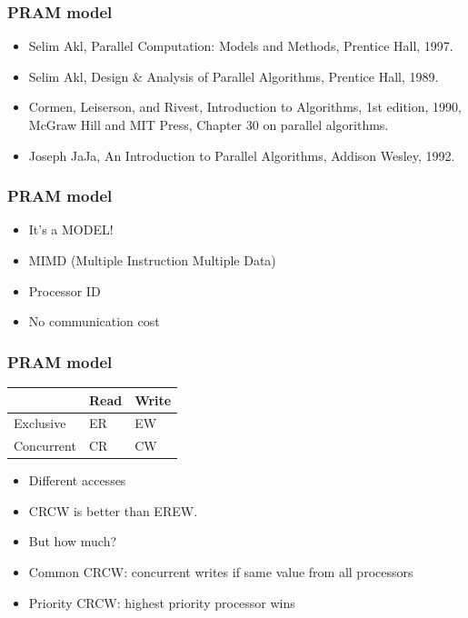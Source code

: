 \documentclass[14pt,aspectratio=169]{beamer}
\begin{document}
\begin{frame}\frametitle{PRAM model}
  \begin{itemize}[<.->]
    \item
Selim Akl, Parallel Computation: Models and Methods, Prentice Hall, 1997.    
    \item
Selim Akl, Design \& Analysis of Parallel Algorithms, Prentice Hall, 1989.
    \item
Cormen, Leiserson, and Rivest, Introduction to Algorithms, 1st edition,
1990, McGraw Hill and MIT Press, Chapter 30 on parallel algorithms.
    \item
Joseph JaJa, An Introduction to Parallel Algorithms, Addison Wesley, 1992.
\end{itemize}
\end{frame}

\begin{frame}\frametitle{PRAM model}
  \begin{itemize}
  \item
    It's a \alert{MODEL}!
  \item
    MIMD (Multiple Instruction Multiple Data)
  \item
    Processor ID
  \item
    No communication cost
  \end{itemize}
\end{frame}

\begin{frame}\frametitle{PRAM model}
\begin{center}
  \begin{tabular}{|l|l|l|}
\hline
 & Read & Write \\
\hline
Exclusive & ER & EW \\
\hline
Concurrent & CR & CW \\
\hline
\end{tabular}

\begin{itemize}
\item
  Different accesses
  \item
    CRCW is better than EREW.
  \item
    But how much?
  \item
    Common CRCW: concurrent writes if same value from all processors
  \item
    Priority CRCW: highest priority processor wins
  \end{itemize}
\end{center}
\end{frame}
\end{document}
